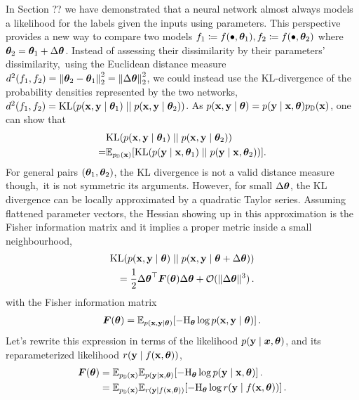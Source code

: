 \switchcolumn[1]
\switchcolumn[0]

In Section ??
we have demonstrated that a neural network almost always models a likelihood for the labels given the inputs using parameters.
This perspective provides a new way to compare two models $f_1 \coloneq f(\bullet, {\bm{\theta}}_1), f_2 \coloneq f(\bullet, {\bm{\theta}}_{2})$ where ${\bm{\theta}}_2 = {\bm{\theta}}_1 + \Delta {\bm{\theta}}$.
Instead of assessing their dissimilarity by their parameters' dissimilarity, \eg\,using the Euclidean distance measure $d^2(f_1, f_2) = \left\lVert {\bm{\theta}}_2 - {\bm{\theta}}_1 \right\rVert_2^2 = \left\lVert \Delta {\bm{\theta}} \right\rVert_2^2$, we could instead use the KL-divergence of the probability densities represented by the two networks, $d^2(f_1, f_2) = \mathrm{KL}(p({\mathbf{x}}, {\mathbf{y}} \mid {\bm{\theta}}_1) \mid\mid p({\mathbf{x}}, {\mathbf{y}} \mid {\bm{\theta}}_2))$.
As $p({\mathbf{x}}, {\mathbf{y}} \mid {\bm{\theta}}) = p({\mathbf{y}} \mid {\mathbf{x}}, {\bm{\theta}})p_{{\mathbb{D}}}({\mathbf{x}})$, one can show that
\begin{align*}
    & \mathrm{KL}(p({\mathbf{x}}, {\mathbf{y}} \mid {\bm{\theta}}_1) \mid\mid p({\mathbf{x}}, {\mathbf{y}} \mid {\bm{\theta}}_2))                               \\
  = & \mathbb{E}_{p_{{\mathbb{D}}}({\mathbf{x}})} [\mathrm{KL}(p({\mathbf{y}} \mid {\mathbf{x}}, {\bm{\theta}}_1) \mid\mid p({\mathbf{y}} \mid {\mathbf{x}}, {\bm{\theta}}_2))].
\end{align*}
For general pairs $({\bm{\theta}}_1, {\bm{\theta}}_2)$, the KL divergence is not a valid distance measure though, \eg\,it is not symmetric \wrt its arguments.
However, for small $\Delta {\bm{\theta}}$, the KL divergence can be locally approximated by a quadratic Taylor series.
Assuming flattened parameter vectors, the Hessian showing up in this approximation is the Fisher information matrix and it implies a proper metric inside a small neighbourhood,
\begin{align*}
  \mathrm{KL}(p({\mathbf{x}}, {\mathbf{y}} \mid {\bm{\theta}}) \mid\mid p({\mathbf{x}}, {\mathbf{y}} \mid {\bm{\theta}} + \Delta {\bm{\theta}}))
  \\
  = \frac{1}{2} {\Delta {\bm{\theta}}}^{\top} {\bm{F}}({\bm{\theta}}) \Delta {\bm{\theta}} + {\mathcal{O}}( \Vert\Delta {\bm{\theta}}\Vert^3)\,.
\end{align*}
with the Fisher information matrix
\begin{align*}
  {\bm{F}}({\bm{\theta}}) = \mathbb{E}_{p({\mathbf{x}}, {\mathbf{y}} \mid {\bm{\theta}})} [-\mathrm{H}_{{\bm{\theta}}} \log p({\mathbf{x}}, {\mathbf{y}} \mid {\bm{\theta}})]\,.
\end{align*}
Let's rewrite this expression in terms of the likelihood $p({\mathbf{y}} \mid {\bm{x}}, {\bm{\theta}})$, and its reparameterized likelihood $r({\mathbf{y}} \mid f({\mathbf{x}}, {\bm{\theta}}))$,
\begin{align*}
  {\bm{F}}({\bm{\theta}})
   & =
  \mathbb{E}_{p_{{\mathbb{D}}}({\mathbf{x}})}\mathbb{E}_{p({\mathbf{y}} \mid {\mathbf{x}}, {\bm{\theta}})} [-\mathrm{H}_{{\bm{\theta}}} \log p({\mathbf{y}} \mid {\mathbf{x}}, {\bm{\theta}})]\,.
  \\
   & =
  \mathbb{E}_{p_{{\mathbb{D}}}({\mathbf{x}})}\mathbb{E}_{r({\mathbf{y}} \mid f({\mathbf{x}}, {\bm{\theta}}))} [-\mathrm{H}_{{\bm{\theta}}} \log r({\mathbf{y}} \mid f({\mathbf{x}}, {\bm{\theta}}))]\,.
\end{align*}
